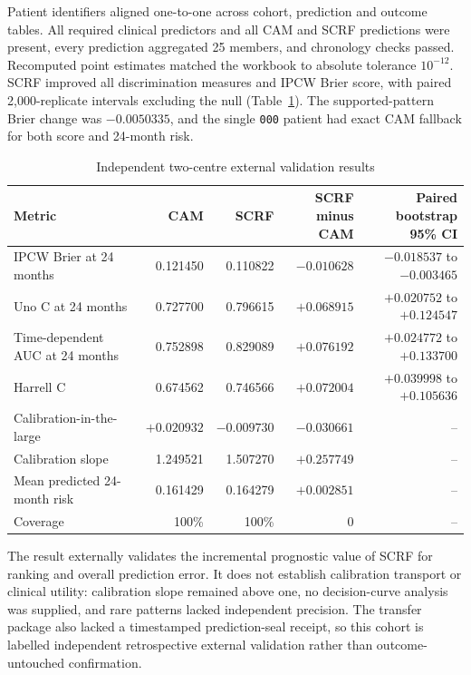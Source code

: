 \documentclass[pdflatex,sn-nature]{sn-jnl}
\begin{document}
Patient identifiers aligned one-to-one across cohort, prediction and outcome tables. All required clinical predictors and all CAM and SCRF predictions were present, every prediction aggregated 25 members, and chronology checks passed. Recomputed point estimates matched the workbook to absolute tolerance $10^{-12}$. SCRF improved all discrimination measures and IPCW Brier score, with paired 2,000-replicate intervals excluding the null (Table~\ref{tab:supptable_external}). The supported-pattern Brier change was $-0.0050335$, and the single \texttt{000} patient had exact CAM fallback for both score and 24-month risk.

\begin{table}[t]
\centering
\caption{Independent two-centre external validation results}\label{tab:supptable_external}
\footnotesize\setlength{\tabcolsep}{2.5pt}
\begin{tabularx}{\textwidth}{>{\raggedright\arraybackslash}Xrrrr}
\toprule
Metric & CAM & SCRF & \makecell{SCRF minus\\CAM} & \makecell{Paired bootstrap\\95\% CI}\\
\midrule
IPCW Brier at 24 months & 0.121450 & 0.110822 & $-0.010628$ & $-0.018537$ to $-0.003465$\\
Uno C at 24 months & 0.727700 & 0.796615 & $+0.068915$ & $+0.020752$ to $+0.124547$\\
Time-dependent AUC at 24 months & 0.752898 & 0.829089 & $+0.076192$ & $+0.024772$ to $+0.133700$\\
Harrell C & 0.674562 & 0.746566 & $+0.072004$ & $+0.039998$ to $+0.105636$\\
Calibration-in-the-large & $+0.020932$ & $-0.009730$ & $-0.030661$ & --\\
Calibration slope & 1.249521 & 1.507270 & $+0.257749$ & --\\
Mean predicted 24-month risk & 0.161429 & 0.164279 & $+0.002851$ & --\\
Coverage & 100\% & 100\% & 0 & --\\
\bottomrule
\end{tabularx}
\end{table}

The result externally validates the incremental prognostic value of SCRF for ranking and overall prediction error. It does not establish calibration transport or clinical utility: calibration slope remained above one, no decision-curve analysis was supplied, and rare patterns lacked independent precision. The transfer package also lacked a timestamped prediction-seal receipt, so this cohort is labelled independent retrospective external validation rather than outcome-untouched confirmation.


\end{document}
